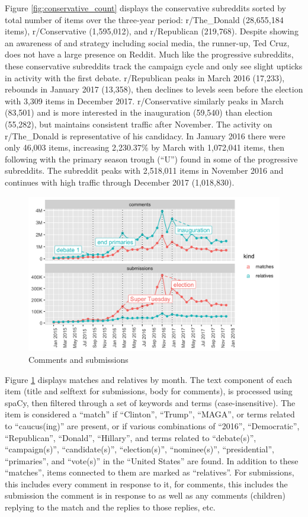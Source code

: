 \documentclass[doublespacing]{utdthesis}
\begin{document}
Figure \ref{fig:conservative_count} displays the conservative subreddits sorted by total number of items over the three-year period: r/The\_Donald (28,655,184 items), r/Conservative (1,595,012), and r/Republican (219,768).
Despite showing an awareness of and strategy including social media, the runner-up, Ted Cruz, does not have a large presence on Reddit.
Much like the progressive subreddits, these conservative subreddits track the campaign cycle and only see slight upticks in activity with the first debate.
r/Republican peaks in March 2016 (17,233), rebounds in January 2017 (13,358), then declines to levels seen before the election with 3,309 items in December 2017.
r/Conservative similarly peaks in March (83,501) and is more interested in the inauguration (59,540) than election (55,282), but maintains consistent traffic after November.
The activity on r/The\_Donald is representative of his candidacy.
In January 2016 there were only 46,003 items, increasing 2,230.37\% by March with 1,072,041 items, then following with the primary season trough (``U'') found in some of the progressive subreddits.
The subreddit peaks with 2,518,011 items in November 2016 and continues with high traffic through December 2017 (1,018,830).

\begin{figure}[!ht]
\centering
\includegraphics[width=\textwidth]{2016/match_count}
\caption{Comments and submissions}
\label{fig:match_count}
\end{figure}

Figure \ref{fig:match_count} displays matches and relatives by month.
The text component of each item (title and selftext for submissions, body for comments), is processed using spaCy, then filtered through a set of keywords and terms (case-insensitive).
The item is considered a ``match'' if ``Clinton'', ``Trump'', ``MAGA'', or terms related to ``caucus(ing)'' are present, or if various combinations of ``2016'', ``Democratic'', ``Republican'', ``Donald'', ``Hillary'', and terms related to ``debate(s)'', ``campaign(s)'', ``candidate(s)'', ``election(s)'', ``nominee(s)'', ``presidential'', ``primaries'', and ``vote(s)'' in the ``United States'' are found.
In addition to these ``matches'', items connected to them are marked as ``relatives''.
For submissions, this includes every comment in response to it, for comments, this includes the submission the comment is in response to as well as any comments (children) replying to the match and the replies to those replies, etc. 
\end{document}
